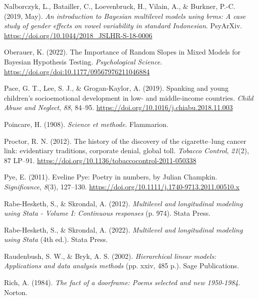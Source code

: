 \documentclass[
  letterpaper,
  DIV=11,
  numbers=noendperiod]{scrreprt}
\newlength{\cslhangindent}
\newlength{\cslentryspacingunit} %
\newenvironment{CSLReferences}[2] %
 {%
  \setlength{\parindent}{0pt}
  \ifodd #1
  \let\oldpar\par
  \def\par{\hangindent=\cslhangindent\oldpar}
  \fi
  \setlength{\parskip}{#2\cslentryspacingunit}
 }%
 {}
\begin{document}
\begin{CSLReferences}{1}{0}
\leavevmode{}%
Nalborczyk, L., Batailler, C., Loevenbruck, H., Vilain, A., \& Burkner,
P.-C. (2019, May). \emph{An introduction to {B}ayesian multilevel models
using brms: A case study of gender effects on vowel variability in
standard {I}ndonesian}. PsyArXiv.
\url{https://doi.org/10.1044/2018_JSLHR-S-18-0006}

\leavevmode{}%
Oberauer, K. (2022). {The Importance of Random Slopes in Mixed Models
for Bayesian Hypothesis Testing}. \emph{Psychological Science}.
\url{https://doi.org/doi:10.1177/09567976211046884}

\leavevmode{}%
Pace, G. T., Lee, S. J., \& Grogan-Kaylor, A. (2019). {Spanking and
young children's socioemotional development in low- and middle-income
countries}. \emph{Child Abuse and Neglect}, \emph{88}, 84--95.
\url{https://doi.org/10.1016/j.chiabu.2018.11.003}

\leavevmode{}%
Poincare, H. (1908). \emph{Science et methode}. Flammarion.

\leavevmode{}%
Proctor, R. N. (2012). {The history of the discovery of the
cigarette--lung cancer link: evidentiary traditions, corporate denial,
global toll}. \emph{Tobacco Control}, \emph{21}(2), 87 LP--91.
\url{https://doi.org/10.1136/tobaccocontrol-2011-050338}

\leavevmode{}%
Pye, E. (2011). {E}veline {P}ye: Poetry in numbers, by {J}ulian
{C}hampkin. \emph{Significance}, \emph{8}(3), 127--130.
\url{https://doi.org/10.1111/j.1740-9713.2011.00510.x}

\leavevmode{}%
Rabe-Hesketh, S., \& Skrondal, A. (2012). \emph{Multilevel and
longitudinal modeling using {S}tata - {V}olume {I}: Continuous
responses} (p. 974). Stata Press.

\leavevmode{}%
Rabe-Hesketh, S., \& Skrondal, A. (2022). \emph{Multilevel and
longitudinal modeling using {S}tata} (4th ed.). Stata Press.

\leavevmode{}%
Raudenbush, S. W., \& Bryk, A. S. (2002). \emph{Hierarchical linear
models: Applications and data analysis methods} (pp. xxiv, 485 p.). Sage
Publications.

\leavevmode{}%
Rich, A. (1984). \emph{The fact of a doorframe: Poems selected and new
1950-1984}. Norton.


\end{CSLReferences}
\end{document}
